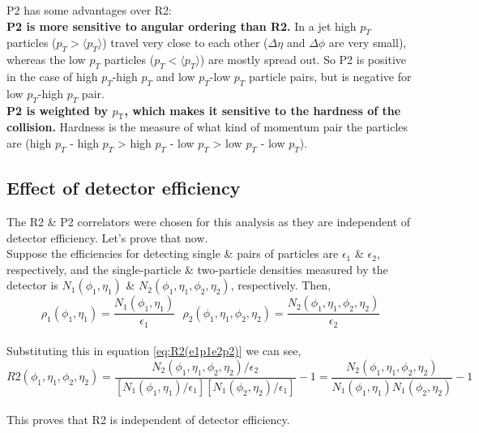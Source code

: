 \documentclass[12pt,a4paper,twoside]{report}
\begin{document}
P2 has some advantages over R2:\\
\textbf{P2 is more sensitive to angular ordering than R2.} In a jet high $p_T$ particles ($p_T>\langle p_T \rangle$) travel very close to each other ($\Delta\eta$ and $\Delta\phi$ are very small), whereas the low $p_T$ particles ($p_T<\langle p_T \rangle$) are mostly spread out. So P2 is positive in the case of high $p_T$-high $p_T$ and low $p_T$-low $p_T$ particle pairs, but is negative for low $p_T$-high $p_T$ pair.\\
\textbf{P2 is weighted by $p_\mathrm{T}$, which makes it sensitive to the hardness of the collision.} Hardness is the measure of what kind of momentum pair the particles are (high $p_T$ - high $p_T$ > high $p_T$ - low $p_T$ > low $p_T$ - low $p_T$).

\subsection{Effect of detector efficiency}
The R2 \& P2 correlators were chosen for this analysis as they are independent of detector efficiency. Let's prove that now.\\

Suppose the efficiencies for detecting single \& pairs of particles are $\epsilon_1$ \& $\epsilon_2$, respectively, and the single-particle \& two-particle densities measured by the detector is $N_1(\phi_1,\eta_1)$ \& $N_2(\phi_1,\eta_1,\phi_2,\eta_2)$, respectively. Then,
\begin{equation}\label{eq:rho1rho2eff}
	\rho_1(\phi_1,\eta_1)=\frac{N_1(\phi_1,\eta_1)}{\epsilon_1}\ \ \ \rho_2(\phi_1,\eta_1,\phi_2,\eta_2)=\frac{N_2(\phi_1,\eta_1,\phi_2,\eta_2)}{\epsilon_2}
\end{equation}
\\
Substituting this in equation \ref{eq:R2(e1p1e2p2)} we can see,
\begin{equation}
	R2(\phi_1,\eta_1,\phi_2,\eta_2)=\frac{N_2(\phi_1,\eta_1,\phi_2,\eta_2)/\epsilon_2}{[N_1(\phi_1,\eta_1)/\epsilon_1][N_1(\phi_2,\eta_2)/\epsilon_1]}-1=\frac{N_2(\phi_1,\eta_1,\phi_2,\eta_2)}{N_1(\phi_1,\eta_1)N_1(\phi_2,\eta_2)}-1
\end{equation}
\\
This proves that R2 is independent of detector efficiency.\\
\end{document}
